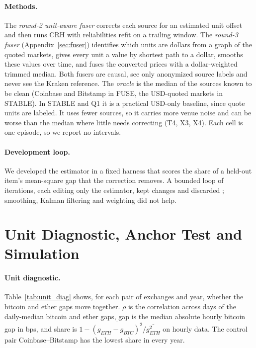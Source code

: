 \documentclass[sigconf,review,anonymous]{acmart}
\begin{document}
\paragraph{Methods.} The \emph{round-2 unit-aware fuser} corrects each source for an estimated unit offset and then runs CRH
with reliabilities refit on a trailing window. The \emph{round-3 fuser} (Appendix~\ref{sec:fuser}) identifies which units are dollars from a graph of
the quoted markets, gives every unit a value by shortest path to a dollar, smooths these values over time, and fuses the
converted prices with a dollar-weighted trimmed median. Both fusers are causal, see only anonymized source labels and never
see the Kraken reference. The \emph{oracle} is the median of the sources known to be clean (Coinbase and Bitstamp in FUSE, the USD-quoted markets in
STABLE). In STABLE and Q1 it is a practical USD-only baseline, since quote units are labeled. It uses fewer sources, so it carries more venue noise and can be worse than the median where little needs correcting (T4, X3, X4). Each cell is one episode, so we report no intervals.

\paragraph{Development loop.} We developed the estimator in a fixed harness that scores the share of a held-out
item's mean-square gap that the correction removes. A bounded loop of
\NumULoopIter{} iterations, each editing only the estimator, kept \NumULoopKept{} changes and discarded \NumULoopDiscarded{}; smoothing, Kalman filtering and weighting did not help.

\section{Unit Diagnostic, Anchor Test and Simulation}
\label{app:anchor}
\paragraph{Unit diagnostic.} Table~\ref{tab:unit_diag} shows, for each pair of exchanges and year, whether the bitcoin and
ether gaps move together. $\rho$ is the correlation across days of the daily-median bitcoin and ether gaps, gap is the median absolute hourly bitcoin gap in bps, and share is
$1-\overline{(g_{ETH}-g_{BTC})^2}/\overline{g_{ETH}^2}$ on hourly data. The control pair Coinbase--Bitstamp has the lowest share in every year.

\end{document}
